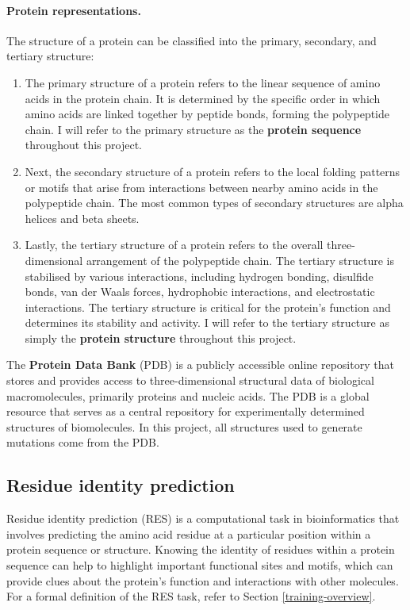 \paragraph{Protein representations.}
The structure of a protein can be classified into the primary, secondary, and tertiary structure:
\begin{enumerate}
\item The primary structure of a protein refers to the linear sequence of amino acids in the protein chain. 
It is determined by the specific order in which amino acids are linked together by peptide bonds, forming the polypeptide chain.
I will refer to the primary structure as the \textbf{protein sequence} throughout this project.
\item Next, the secondary structure of a protein refers to the local folding patterns or motifs that arise from interactions between nearby amino acids in the polypeptide chain. 
The most common types of secondary structures are alpha helices and beta sheets.
\item Lastly, the tertiary structure of a protein refers to the overall three-dimensional arrangement of the polypeptide chain.
The tertiary structure is stabilised by various interactions, including hydrogen bonding, disulfide bonds, van der Waals forces, hydrophobic interactions, and electrostatic interactions. The tertiary structure is critical for the protein's function and determines its stability and activity. I will  refer to the tertiary structure as simply the \textbf{protein structure} throughout this project.
\end{enumerate}

The \textbf{Protein Data Bank} (PDB) \cite{rcsb_pdb} is a publicly accessible online repository that stores and provides access to three-dimensional structural data of biological macromolecules, primarily proteins and nucleic acids. 
The PDB is a global resource that serves as a central repository for experimentally determined structures of biomolecules. In this project, all structures used to generate mutations come from the PDB.

\subsection{Residue identity prediction}
Residue identity prediction (RES) is a computational task in bioinformatics that involves predicting the amino acid residue at a particular position within a protein sequence or structure. 
Knowing the identity of residues within a protein sequence can help to highlight important functional sites and motifs, which can provide clues about the protein's function and interactions with other molecules. For a formal definition of the RES task, refer to Section \ref{training-overview}.

